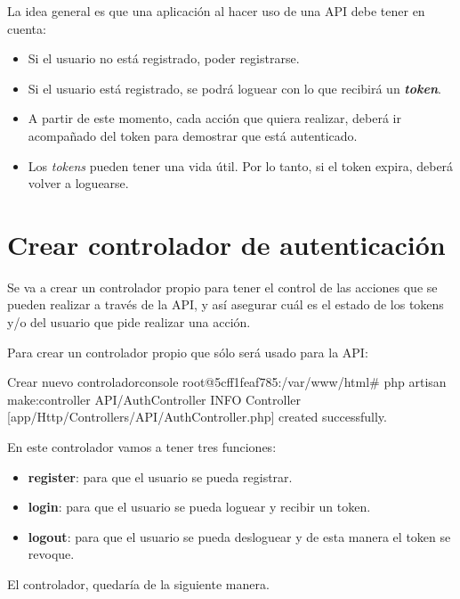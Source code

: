 La idea general es que una aplicación al hacer uso de una API debe tener en cuenta:

\begin{itemize}
    \item Si el usuario no está registrado, poder registrarse.
    \item Si el usuario está registrado, se podrá loguear con lo que recibirá un \textbf{\textit{token}}.
    \item A partir de este momento, cada acción que quiera realizar, deberá ir acompañado del token para demostrar que está autenticado.
    \item Los \textit{tokens} pueden tener una vida útil. Por lo tanto, si el token expira, deberá volver a loguearse.
\end{itemize}

\section{Crear controlador de autenticación}

Se va a crear un controlador propio para tener el control de las acciones que se pueden realizar a través de la API, y así asegurar cuál es el estado de los tokens y/o del usuario que pide realizar una acción.

Para crear un controlador propio que sólo será usado para la API:

\begin{mycode}{Crear nuevo controlador}{console}{{\footnotesize }}
root@5cff1feaf785:/var/www/html# php artisan make:controller API/AuthController
INFO  Controller [app/Http/Controllers/API/AuthController.php] created successfully.
\end{mycode}

En este controlador vamos a tener tres funciones:

\begin{itemize}
    \item \textbf{register}: para que el usuario se pueda registrar.
    \item \textbf{login}: para que el usuario se pueda loguear y recibir un token.
    \item \textbf{logout}: para que el usuario se pueda desloguear y de esta manera el token se revoque.
\end{itemize}

El controlador, quedaría de la siguiente manera.


